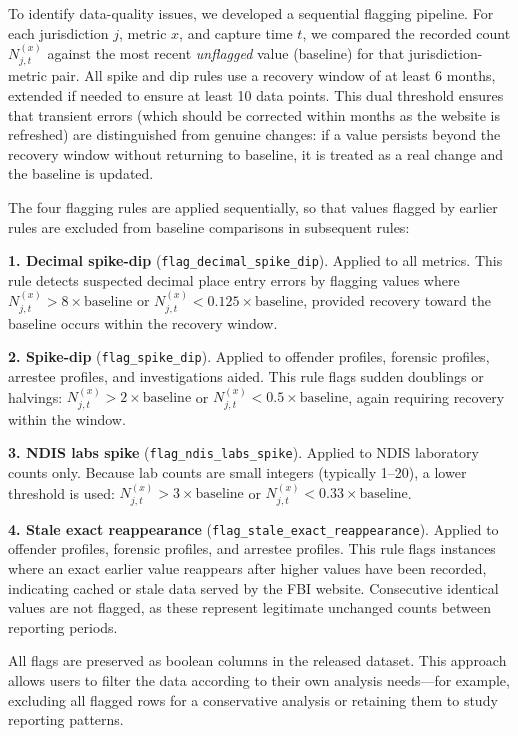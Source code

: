 \documentclass{article}
\begin{document}
To identify data-quality issues, we developed a sequential flagging pipeline. For each jurisdiction $j$, metric $x$, and capture time $t$, we compared the recorded count $N_{j,t}^{(x)}$ against the most recent \textit{unflagged} value (baseline) for that jurisdiction-metric pair. All spike and dip rules use a recovery window of at least 6 months, extended if needed to ensure at least 10 data points. This dual threshold ensures that transient errors (which should be corrected within months as the website is refreshed) are distinguished from genuine changes: if a value persists beyond the recovery window without returning to baseline, it is treated as a real change and the baseline is updated.

The four flagging rules are applied sequentially, so that values flagged by earlier rules are excluded from baseline comparisons in subsequent rules:

\textbf{1. Decimal spike-dip} (\texttt{flag\_decimal\_spike\_dip}). Applied to all metrics. This rule detects suspected decimal place entry errors by flagging values where $N_{j,t}^{(x)} > 8 \times \text{baseline}$ or $N_{j,t}^{(x)} < 0.125 \times \text{baseline}$, provided recovery toward the baseline occurs within the recovery window.

\textbf{2. Spike-dip} (\texttt{flag\_spike\_dip}). Applied to offender profiles, forensic profiles, arrestee profiles, and investigations aided. This rule flags sudden doublings or halvings: $N_{j,t}^{(x)} > 2 \times \text{baseline}$ or $N_{j,t}^{(x)} < 0.5 \times \text{baseline}$, again requiring recovery within the window.

\textbf{3. NDIS labs spike} (\texttt{flag\_ndis\_labs\_spike}). Applied to NDIS laboratory counts only. Because lab counts are small integers (typically 1--20), a lower threshold is used: $N_{j,t}^{(x)} > 3 \times \text{baseline}$ or $N_{j,t}^{(x)} < 0.33 \times \text{baseline}$.

\textbf{4. Stale exact reappearance} (\texttt{flag\_stale\_exact\_reappearance}). Applied to offender profiles, forensic profiles, and arrestee profiles. This rule flags instances where an exact earlier value reappears after higher values have been recorded, indicating cached or stale data served by the FBI website. Consecutive identical values are not flagged, as these represent legitimate unchanged counts between reporting periods.

All flags are preserved as boolean columns in the released dataset. This approach allows users to filter the data according to their own analysis needs---for example, excluding all flagged rows for a conservative analysis or retaining them to study reporting patterns.
\end{document}
